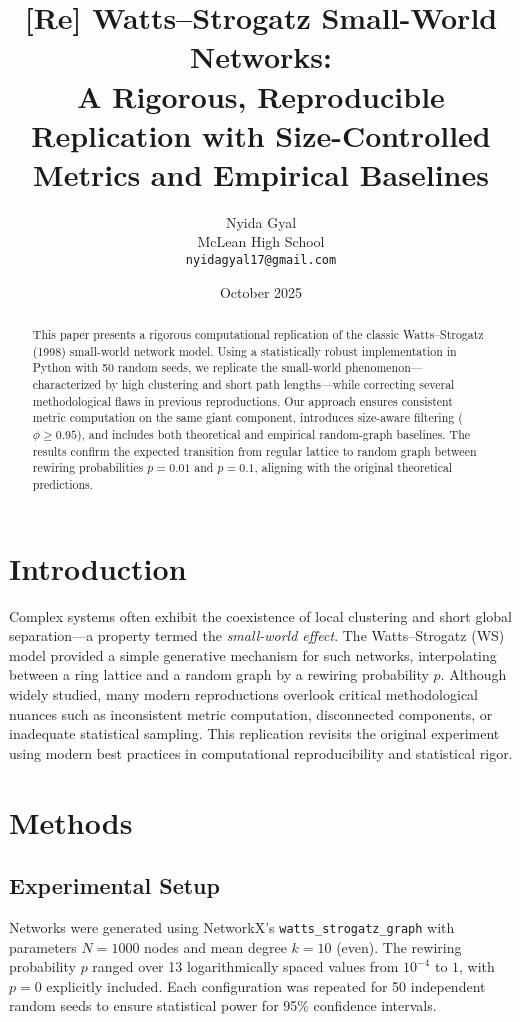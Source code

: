 \documentclass[11pt,a4paper]{article}
\title{[Re] Watts–Strogatz Small-World Networks:\\
A Rigorous, Reproducible Replication with Size-Controlled Metrics and Empirical Baselines}
\author{Nyida Gyal \\ McLean High School \\ 
\texttt{nyidagyal17@gmail.com}}
\date{October 2025}
\begin{document}
\maketitle

\begin{abstract}
This paper presents a rigorous computational replication of the classic Watts–Strogatz (1998) small-world network model. Using a statistically robust implementation in Python with 50 random seeds, we replicate the small-world phenomenon—characterized by high clustering and short path lengths—while correcting several methodological flaws in previous reproductions. Our approach ensures consistent metric computation on the same giant component, introduces size-aware filtering ($\phi \ge 0.95$), and includes both theoretical and empirical random-graph baselines. The results confirm the expected transition from regular lattice to random graph between rewiring probabilities $p=0.01$ and $p=0.1$, aligning with the original theoretical predictions.
\end{abstract}

\section{Introduction}
Complex systems often exhibit the coexistence of local clustering and short global separation---a property termed the \emph{small-world effect}. The Watts--Strogatz (WS) model \citep{watts1998collective} provided a simple generative mechanism for such networks, interpolating between a ring lattice and a random graph by a rewiring probability $p$. Although widely studied, many modern reproductions overlook critical methodological nuances such as inconsistent metric computation, disconnected components, or inadequate statistical sampling. This replication revisits the original experiment using modern best practices in computational reproducibility and statistical rigor.

\section{Methods}
\subsection{Experimental Setup}
Networks were generated using NetworkX’s \texttt{watts\_strogatz\_graph} with parameters $N=1000$ nodes and mean degree $k=10$ (even). The rewiring probability $p$ ranged over 13 logarithmically spaced values from $10^{-4}$ to $1$, with $p=0$ explicitly included. Each configuration was repeated for 50 independent random seeds to ensure statistical power for 95\% confidence intervals.
\end{document}
